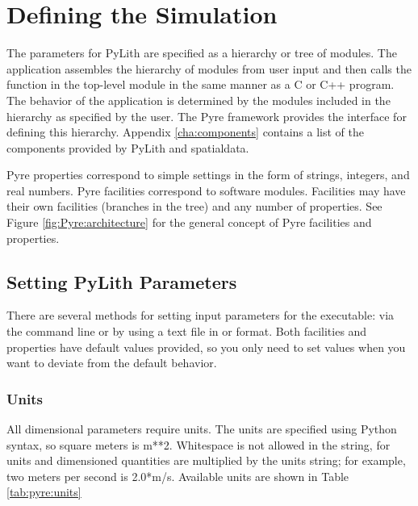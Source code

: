 \section{Defining the Simulation}

The parameters for PyLith are specified as a hierarchy or tree of
modules. The application assembles the hierarchy of modules from user
input and then calls the  function in the top-level
module in the same manner as a C or C++ program. The behavior of the
application is determined by the modules included in the hierarchy as
specified by the user. The Pyre framework provides the interface for
defining this hierarchy. Appendix \vref{cha:components} contains a
list of the components provided by PyLith and spatialdata.

Pyre properties correspond to simple settings in the form of strings,
integers, and real numbers. Pyre facilities correspond to software
modules. Facilities may have their own facilities (branches in the
tree) and any number of properties. See Figure
\vref{fig:Pyre:architecture} for the general concept of Pyre
facilities and properties.

\subsection{Setting PyLith Parameters}
\label{sec:setting:parameters}

There are several methods for setting input parameters for the
 executable: via the command line or by using a text
file in  or  format. Both facilities and
properties have default values provided, so you only need to set
values when you want to deviate from the default behavior.


\subsubsection{Units}

All dimensional parameters require units. The units are specified
using Python syntax, so square meters is m**2. Whitespace is not
allowed in the string, for units and dimensioned quantities are
multiplied by the units string; for example, two meters per second is
2.0*m/s. Available units are shown in Table \vref{tab:pyre:units}

